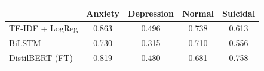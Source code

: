 \begin{tabular}{lcccc}
\toprule
 & Anxiety & Depression & Normal & Suicidal \\
\midrule
TF-IDF + LogReg & 0.863 & 0.496 & 0.738 & 0.613 \\
BiLSTM & 0.730 & 0.315 & 0.710 & 0.556 \\
DistilBERT (FT) & 0.819 & 0.480 & 0.681 & 0.758 \\
\bottomrule
\end{tabular}
